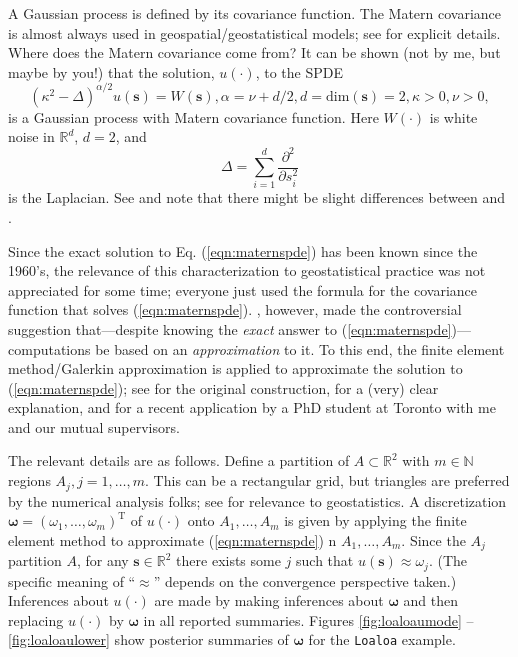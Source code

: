 \documentclass[12pt]{article}
\newcommand{\Nats}{\mathbb{N}}
\newcommand{\Reals}{\mathbb{R}}
\newcommand{\mb}[1]{\boldsymbol{#1}}
\newcommand{\Tr}{^{\textrm{T}}}
\begin{document}
A Gaussian process is defined by its covariance function.
The Matern covariance is almost always used in geospatial/geostatistical models; see \citet[Appendix A]{geostatsp} for explicit details.
Where does the Matern covariance come from?
It can be shown (not by me, but maybe by you!) that the solution, $u(\cdot)$, to the SPDE
\begin{equation}\label{eqn:maternspde}
(\kappa^2 - \Delta)^{\alpha/2}u(\mb{s}) = W(\mb{s}), \alpha = \nu + d/2, d = \text{dim}(\mb{s}) = 2, \kappa > 0, \nu > 0,
\end{equation}
is a Gaussian process with Matern covariance function. 
Here $W(\cdot)$ is white noise in $\Reals^d$, $d=2$, and
$$
\Delta = \sum_{i=1}^{d}\frac{\partial^2}{\partial s_i^2}
$$
is the Laplacian.
See \citet[Eq. (1), (2), and (4)]{spde} and note that there might be
slight differences between \citet{spde} and \citet{geostatsp}.

Since the exact solution to Eq. (\ref{eqn:maternspde}) has been known since the 1960's, the relevance of this characterization
to geostatistical practice was not appreciated for some time; everyone just used the formula for the covariance function that solves (\ref{eqn:maternspde}).
\citet{spde}, however, made the controversial suggestion that---despite knowing the \emph{exact} answer to (\ref{eqn:maternspde})---
computations be based on an \emph{approximation} to it. To this end, the finite element method/Galerkin approximation is applied
to approximate the solution to (\ref{eqn:maternspde}); see \citet{spde} for the original construction, \citet{miller2020understanding}
for a (very) clear explanation, and \citet{zhang2024model} for a recent application by a PhD student at Toronto with me and our mutual supervisors. 

The relevant details are as follows. Define a partition of $A\subset\Reals^2$ with $m\in\Nats$ regions $A_{j},j=1,\ldots,m$.
This can be a rectangular grid, but triangles are preferred by the numerical analysis folks; see \citet{simpson2016going} for relevance to geostatistics.
A discretization $\mb{\omega} = (\omega_1,\ldots,\omega_m)\Tr$ of $u(\cdot)$ onto $A_1,\ldots,A_m$ is given by applying the finite element method to approximate (\ref{eqn:maternspde}) n $A_1,\ldots,A_m$.
Since the $A_j$ partition $A$, for any $\mb{s}\in\Reals^2$ there exists some $j$ such that $u(\mb{s})\approx\omega_j$.
(The specific meaning of ``$\approx$'' depends on the convergence perspective taken.)
Inferences about $u(\cdot)$ are made by making inferences about $\mb{\omega}$ and then replacing $u(\cdot)$ by $\mb{\omega}$
in all reported summaries. Figures \ref{fig:loaloaumode} -- \ref{fig:loaloaulower} show posterior summaries of $\mb{\omega}$
for the \texttt{Loaloa} example.
\end{document}
